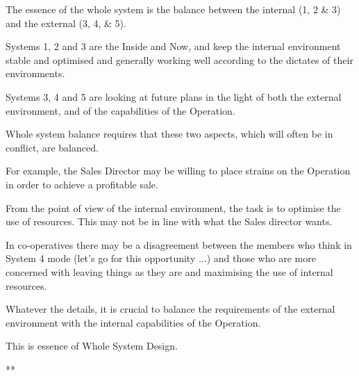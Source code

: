The essence of the whole system is the balance between the internal (1, 2 \& 3) and the external (3, 4, \& 5).

Systems 1, 2 and 3 are the Inside and Now, and keep the internal environment stable and optimised and generally working well according to the dictates of their environments.

Systems 3, 4 and 5 are looking at future plans in the light of both the external environment, and of the capabilities of the Operation.

Whole system balance requires that these two aspects, which will often be in conflict, are balanced.

For example, the Sales Director may be willing to place strains on the Operation in order to achieve a profitable sale.

From the point of view of the internal environment, the task is to optimise the use of resources. This may not be in line with what the Sales director wants.

In co-operatives there may be a disagreement between the members who think in System 4 mode (let's go for this opportunity ...) and those who are more concerned with leaving things as they are and maximising the use of internal resources.

Whatever the details, it is crucial to balance the requirements of the external environment with the internal capabilities of the Operation.

This is essence of Whole System Design.

**

